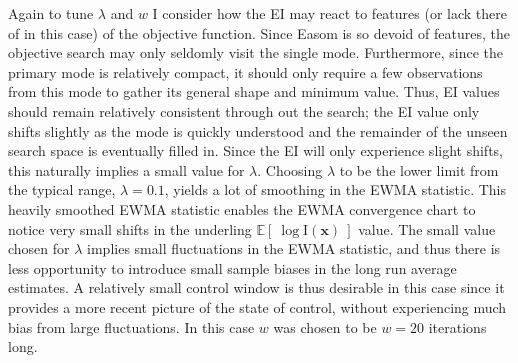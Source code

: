 \documentclass[12pt]{article}
\newcommand{\E}[1]{
        \mathbb{E}\left[~#1~\right]
}
\def \ix {
	\text{I}(\bm{x})
}
\begin{document}
	
	Again to tune $\lambda$ and $w$ I consider how the EI may react to features (or lack there of in this case) of the objective function. %
	Since Easom is so devoid of features, the objective search may only seldomly visit the single mode.
	Furthermore, since the primary mode is relatively compact, it should only require a few observations from this mode to gather its general shape and minimum value.   
	Thus, EI values should remain relatively consistent through out the search; the EI value only shifts slightly as the mode is quickly understood and the remainder of the unseen search space is eventually filled in.
	Since the EI will only experience slight shifts, this naturally implies a small value for $\lambda$.
	Choosing $\lambda$ to be the lower limit from the typical range, $\lambda=0.1$, yields a lot of smoothing in the EWMA statistic.
	This heavily smoothed EWMA statistic enables the EWMA convergence chart to notice very small shifts in the underling $\E{\log\ix}$ value. 
	The small value chosen for $\lambda$ implies small fluctuations in the EWMA statistic, and thus there is less opportunity to introduce small sample biases in the long run average estimates. 
	A relatively small control window is thus desirable in this case since it provides a more recent picture of the state of control, without experiencing much bias from large fluctuations.
	In this case $w$ was chosen to be $w=20$ iterations long.
	
\end{document}
